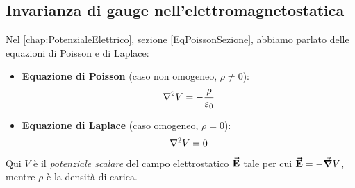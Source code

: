 \subsection{Invarianza di gauge nell'elettromagnetostatica}
Nel \autoref{chap:PotenzialeElettrico}, sezione \ref{EqPoissonSezione}, abbiamo parlato delle equazioni di Poisson e di Laplace:
\begin{itemize}
	\item \textbf{Equazione di Poisson} (caso non omogeneo, $\rho\neq 0$):
	\begin{equation}
		\laplacian{V}=-\frac{\rho}{\epsilon_0}
	\end{equation}
	\item \textbf{Equazione di Laplace} (caso omogeneo, $\rho=0$):
	\begin{equation}
		\laplacian{V}=0
	\end{equation}
\end{itemize}
Qui $V$ è il \textit{potenziale scalare} del campo elettrostatico $\vb*{\va{E}}$ tale per cui $\vb*{\va{E}}=-\grad{V}$, mentre $\rho$ è la densità di carica.

